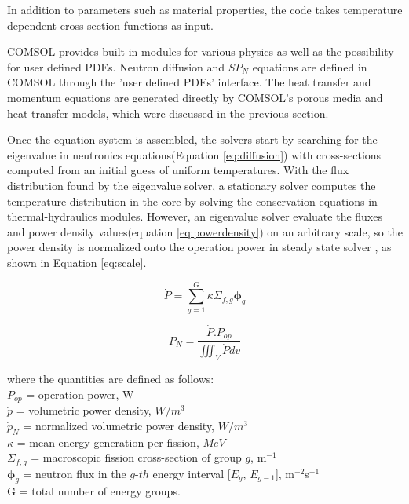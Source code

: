 \documentclass{elsarticle}
\newcommand{\flux}{{\ensuremath{\boldsymbol{\phi}}} }
\begin{document}
In addition to parameters such as material properties, the code takes temperature dependent cross-section functions as input.

COMSOL provides built-in modules for various physics as well as the possibility for user defined PDEs. Neutron diffusion and $SP_N$ equations are defined in COMSOL through the 'user defined PDEs' interface. The heat transfer and momentum equations are generated directly by COMSOL's porous media and heat transfer models, which were discussed in the previous section.



Once the equation system is assembled, the solvers start by searching for the eigenvalue in neutronics equations(Equation \ref{eq:diffusion}) with cross-sections computed from an initial guess of uniform temperatures. 
With the flux distribution found by the eigenvalue solver, a stationary solver computes the temperature distribution in the core by solving the conservation equations in thermal-hydraulics modules. However, an eigenvalue solver evaluate the fluxes and power density values(equation \ref{eq:powerdensity}) on an arbitrary scale, so the power density is normalized onto the operation power in steady state solver , as shown in Equation \ref{eq:scale}.  

\begin{equation}
  \dot{P} = \sum_{g=1}^G \kappa \Sigma_{f,g} \flux _g
  \label{eq:powerdensity}
\end{equation}

\begin{equation}
  \dot{P}_N = \frac{\dot{P}.P_{op}}{\iiint_V{\dot{P}dv}}
  \label{eq:scale}
\end{equation}

where the quantities are defined as follows:\\
$P_{op}$ = operation power, W\\
$\dot{p}$ = volumetric power density, $W/m^3$\\
$\dot{p}_N$ = normalized volumetric power density, $W/m^3$\\
$\kappa$ = mean energy generation per fission, $MeV$\\
$\Sigma_{f,g}$ = macroscopic fission cross-section of group $g$, m$^{-1}$\\
$\flux_{g}$ = neutron flux in the $g$-$th$ energy interval [$E_g$, $E_{g-1}$], m$^{-2}$s$^{-1}$\\
G = total number of energy groups.
 
\end{document}
